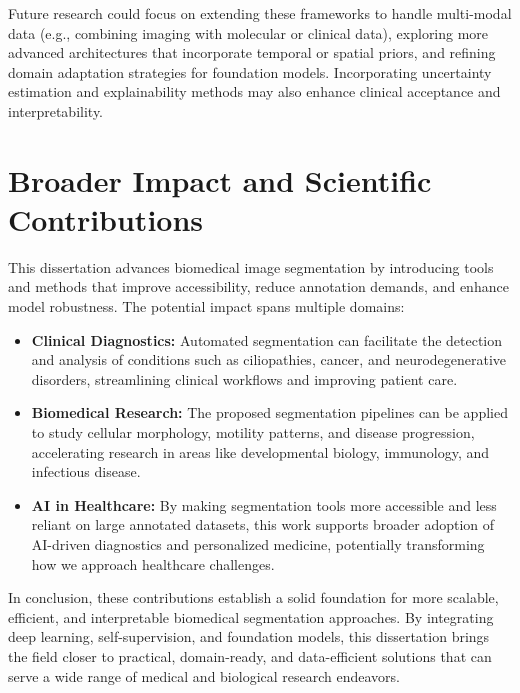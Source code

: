\documentclass[./dissertation.tex]{subfiles}
\begin{document}
Future research could focus on extending these frameworks to handle multi-modal data (e.g., combining imaging with molecular or clinical data), exploring more advanced architectures that incorporate temporal or spatial priors, and refining domain adaptation strategies for foundation models. Incorporating uncertainty estimation and explainability methods may also enhance clinical acceptance and interpretability.

\section{Broader Impact and Scientific Contributions}
This dissertation advances biomedical image segmentation by introducing tools and methods that improve accessibility, reduce annotation demands, and enhance model robustness. The potential impact spans multiple domains:

\begin{itemize}
    \item \textbf{Clinical Diagnostics:} Automated segmentation can facilitate the detection and analysis of conditions such as ciliopathies, cancer, and neurodegenerative disorders, streamlining clinical workflows and improving patient care.
    \item \textbf{Biomedical Research:} The proposed segmentation pipelines can be applied to study cellular morphology, motility patterns, and disease progression, accelerating research in areas like developmental biology, immunology, and infectious disease.
    \item \textbf{AI in Healthcare:} By making segmentation tools more accessible and less reliant on large annotated datasets, this work supports broader adoption of AI-driven diagnostics and personalized medicine, potentially transforming how we approach healthcare challenges.
\end{itemize}

In conclusion, these contributions establish a solid foundation for more scalable, efficient, and interpretable biomedical segmentation approaches. By integrating deep learning, self-supervision, and foundation models, this dissertation brings the field closer to practical, domain-ready, and data-efficient solutions that can serve a wide range of medical and biological research endeavors.








\end{document}

